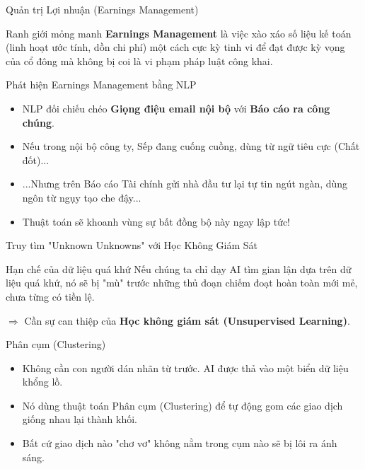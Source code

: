 \documentclass[aspectratio=169]{beamer}
\begin{document}
\begin{frame}{Quản trị Lợi nhuận (Earnings Management)}
    \begin{exampleblock}{Ranh giới mỏng manh}
        \textbf{Earnings Management} là việc xào xáo số liệu kế toán (linh hoạt ước tính, dồn chi phí) một cách cực kỳ tinh vi để đạt được kỳ vọng của cổ đông mà không bị coi là vi phạm pháp luật công khai.
    \end{exampleblock}
\end{frame}

\begin{frame}{Phát hiện Earnings Management bằng NLP}
    \begin{itemize}
        \item NLP đối chiếu chéo \textbf{Giọng điệu email nội bộ} với \textbf{Báo cáo ra công chúng}.
        \item Nếu trong nội bộ công ty, Sếp đang cuống cuồng, dùng từ ngữ tiêu cực (Chất đốt)...
        \item ...Nhưng trên Báo cáo Tài chính gửi nhà đầu tư lại tự tin ngút ngàn, dùng ngôn từ ngụy tạo che đậy...
        \item Thuật toán sẽ khoanh vùng sự bất đồng bộ này ngay lập tức!
    \end{itemize}
\end{frame}

\begin{frame}{Truy tìm "Unknown Unknowns" với Học Không Giám Sát}
    \begin{alertblock}{Hạn chế của dữ liệu quá khứ}
        Nếu chúng ta chỉ dạy AI tìm gian lận dựa trên dữ liệu quá khứ, nó sẽ bị "mù" trước những thủ đoạn chiếm đoạt hoàn toàn mới mẻ, chưa từng có tiền lệ.
    \end{alertblock}
    $\Rightarrow$ Cần sự can thiệp của \textbf{Học không giám sát (Unsupervised Learning)}.
\end{frame}

\begin{frame}{Phân cụm (Clustering)}
    \begin{itemize}
        \item Không cần con người dán nhãn từ trước. AI được thả vào một biển dữ liệu khổng lồ.
        \item Nó dùng thuật toán Phân cụm (Clustering) để tự động gom các giao dịch giống nhau lại thành khối.
        \item Bất cứ giao dịch nào "chơ vơ" không nằm trong cụm nào sẽ bị lôi ra ánh sáng.
    \end{itemize}
\end{frame}
\end{document}
